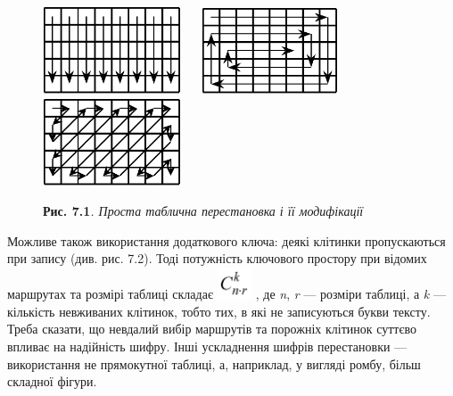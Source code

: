 \begin{figure}
\centering
\begin{minipage}{5.8634in}
{\centering\bfseries
 \includegraphics[width=1.6201in,height=1.0209in]{crypt-img/crypt-img64.png}
\ \  
\includegraphics[width=1.6201in,height=1.0102in]{crypt-img/crypt-img65.png} 
\ \ 
\includegraphics[width=1.6201in,height=1.0209in]{crypt-img/crypt-img66.png} 
\par}
\end{minipage}
\end{figure}
\begin{figure}
\centering
\begin{minipage}{5.4543in}
{\centering
\textbf{Рис. 7.1}\textit{. Проста таблична перестановка і її модифікації}
\par}


\bigskip
\end{minipage}
\end{figure}

\bigskip


\bigskip

Можливе також використання додаткового ключа: деякі клітинки пропускаються при
запису (див. рис. 7.2). Тоді потужність ключового простору при відомих
маршрутах та розмірі таблиці складає 
\includegraphics[width=0.4016in,height=0.3681in]{crypt-img/crypt-img67.png} ,
де \textit{n}, \textit{r }--- розміри таблиці, а \textit{k}\textit{ }--- кількість
невживаних клітинок, тобто тих, в які не записуються букви тексту. Треба
сказати, що невдалий  вибір маршрутів та порожніх клітинок суттєво впливає на
надійність шифру. Інші ускладнення шифрів перестановки --- використання не
прямокутної таблиці, а, наприклад, у вигляді ромбу, більш складної фігури.


